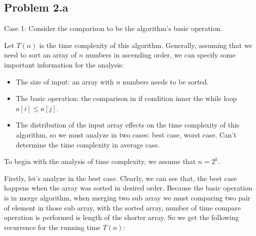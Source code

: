 \documentclass[a4paper]{article}
\begin{document}
\subsection{Problem 2.a}
Case 1: Consider the comparison to be the algorithm's basic operation. \par \bigskip
Let $T(n)$ is the time complexity of this algorithm. Generally, assuming that we need to sort an array of $n$ numbers in ascending order, we can specify some important information for the analysis:
\begin{itemize}
    \item The size of input: an array with $n$ numbers needs to be sorted.
    \item The basic operation: the comparison in if condition inner the while loop $a[i] \leq a[j]$.
    \item The distribution of the input array effects on the time complexity of this algorithm, so we must analyze in two cases: best case, worst case. Can't determine the time complexity in average case.
\end{itemize}
To begin with the analysis of time complexity, we assume that $n = 2^k$. 
\par \bigskip
Firstly, let's analyze in the best case. Clearly, we can see that, the best case happens when the array was sorted in desired order. Because the basic operation is in merge algorithm, when merging two sub array we must comparing two pair of element in those sub array, with the sorted array, number of time compare operation is performed is length of the shorter array. So we get the following recurrence for the running time $T(n)$:
\end{document}
